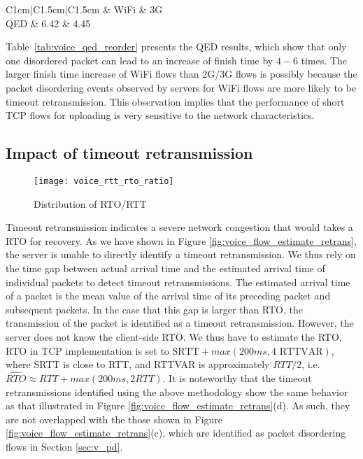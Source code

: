 \begin{table}[th]
\caption{QED results for the impact of packet disordering.}
\label{tab:voice_qed_reorder}
\centering
\renewcommand{\arraystretch}{1}
\begin{tabular}{C{1cm}|C{1.5cm}|C{1.5cm}}
	\hline
	 & WiFi & 3G \\
	\hline
	QED & 6.42 & 4.45 \\
	\hline
\end{tabular}
\end{table}

Table~\ref{tab:voice_qed_reorder} presents the QED results, which show that only one disordered packet can lead to an increase of finish time by $4-6$ times. The larger finish time increase of WiFi flows than 2G/3G flows is possibly because the packet disordering events observed by servers for WiFi flows are more likely to be timeout retransmission. This observation implies that the performance of short TCP flows for uploading is very sensitive to the network characteristics. 

\subsection{Impact of timeout retransmission}\label{sec:v_rto}

\begin{figure}[th]
\centering
	\texttt{[image: voice\_rtt\_rto\_ratio]}
\caption{Distribution of RTO/RTT}
\label{fig:rto_rtt}
\end{figure}

Timeout retransmission indicates a severe network congestion that would takes a RTO for recovery. As we have shown in Figure  \ref{fig:voice_flow_estimate_retrans}, the server is unable to directly identify a timeout retransmission. We thus rely on the time gap between actual arrival time and the estimated arrival time of individual packets to detect timeout retransmissions. The estimated arrival time of a packet is the mean value of the arrival time of its preceding packet and subsequent packets. In the case that this gap is larger than RTO, the transmission of the packet is identified as a timeout retransmission. However, the server does not know the client-side RTO. We thus have to estimate the RTO. RTO in TCP implementation is set to $\text{SRTT} + max(200ms, 4 \text{ RTTVAR})$\cite{rfc62982011computing}, where SRTT is close to RTT, and RTTVAR is approximately $RTT/2$, i.e. $\widehat{RTO} \approx RTT + max(200ms, 2 RTT)$. It is noteworthy that the timeout retransmissions identified using the above methodology show the same behavior as that illustrated in Figure \ref{fig:voice_flow_estimate_retrans}(d). As such, they are not overlapped with the those shown in Figure \ref{fig:voice_flow_estimate_retrans}(c), which are identified as packet disordering flows in Section \ref{sec:v_pd}.


